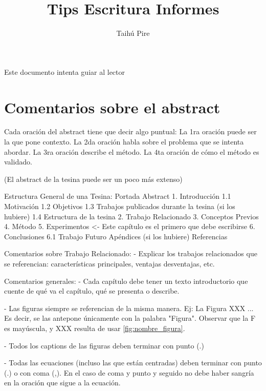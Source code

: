 \documentclass[a4paper,	11pt]{article}
\begin{document}
\renewcommand\floatpagefraction{.9}
\renewcommand\topfraction{.9}
\renewcommand\bottomfraction{.9}
\renewcommand\textfraction{.1}
\setcounter{totalnumber}{50}
\setcounter{topnumber}{50}
\setcounter{bottomnumber}{50}

\title{Tips Escritura Informes}
\author{Taihú Pire}


\maketitle


Este documento intenta guiar al lector


\section{Comentarios sobre el abstract}
Cada oración del abstract tiene que decir algo puntual:
La 1ra oración puede ser la que pone contexto.
La 2da oración habla sobre el problema que se intenta abordar.
La 3ra oración describe el método.
La 4ta oración de cómo el método es validado.

(El abstract de la tesina puede ser un poco más extenso)

Estructura General de una Tesina:
Portada
Abstract
1. Introducción
1.1 Motivación
1.2 Objetivos
1.3 Trabajos publicados durante la tesina (si los hubiere)
1.4 Estructura de la tesina
2. Trabajo Relacionado
3. Conceptos Previos
4. Método
5. Experimentos <- Este capítulo es el primero que debe escribirse
6. Conclusiones
6.1 Trabajo Futuro
Apéndices (si los hubiere)
Referencias

Comentarios sobre Trabajo Relacionado:
- Explicar los trabajos relacionados que se referencian: características principales, ventajas desventajas, etc.

Comentarios generales:
- Cada capítulo debe tener un texto introductorio que cuente de qué va el capítulo, qué se presenta o describe.

- Las figuras siempre se referencian de la misma manera. Ej: La Figura XXX ... Es decir, se las antepone únicamente con la palabra "Figura". Observar que la F es mayúscula, y XXX resulta de usar \ref{fig:nombre_figura}.

- Todos los captions de las figuras deben terminar con punto (.)

- Todas las ecuaciones (incluso las que están centradas) deben terminar con punto (.) o con coma (,). En el caso de coma y punto y seguido no debe haber sangría en la oración que sigue a la ecuación.
\end{document}
